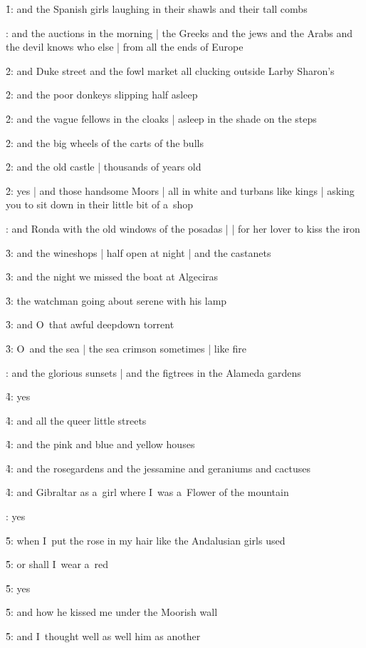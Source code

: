 \f1:
and the Spanish girls laughing in their shawls and their tall combs

:
and the auctions in the morning |
the Greeks and the jews and the Arabs and the devil knows who else |
from all the ends of Europe

\f2:
and Duke street and the fowl market all clucking outside Larby Sharon's

\f2:
and the poor donkeys slipping half asleep

\f2:
and the vague fellows in the cloaks |
asleep in the shade on the steps

\f2:
and the big wheels of the carts of the bulls

\f2:
and the old castle |
thousands of years old

\f2:
yes |
and those handsome Moors |
all in white and turbans like kings |
asking you to sit down in their little bit of a~shop

:
and Ronda with the old windows of the posadas |
 |
for her lover to kiss the iron

\f3:
and the wineshops |
half open at night |
and the castanets

\f3:
and the night we missed the boat at Algeciras

\f3:
the watchman going about serene with his lamp

\f3:
and O~that awful deepdown torrent

\f3:
O~and the sea |
the sea crimson sometimes |
like fire

:
and the glorious sunsets |
and the figtrees in the Alameda gardens

\f4:
yes

\f4:
and all the queer little streets

\f4:
and the pink and blue and yellow houses

\f4:
and the rosegardens and the jessamine and geraniums and cactuses

\f4:
and Gibraltar as a~girl where I~was a~Flower of the mountain

:
yes

\f5:
when I~put the rose in my hair like the Andalusian girls used

\f5:
or shall I~wear a~red

\f5:
yes

\f5:
and how he kissed me under the Moorish wall

\f5:
and I~thought well as well him as another

